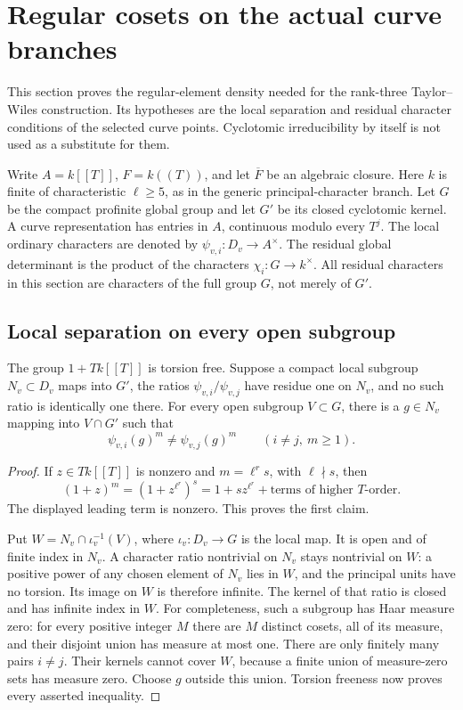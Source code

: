 \section{Regular cosets on the actual curve branches}
\label{sec:sr-curve-regular-cosets}
This section proves the regular-element density needed for the
rank-three Taylor--Wiles construction.  Its hypotheses are the
local separation and residual character conditions of the selected
curve points.  Cyclotomic irreducibility by itself is not used as a
substitute for them.

Write \(A=k[[T]]\), \(F=k((T))\), and let \(\overline F\) be an
algebraic closure.  Here \(k\) is finite of characteristic
\(\ell\ge5\), as in the generic principal-character branch.
Let \(G\) be the compact profinite global group and let
\(G'\) be its closed cyclotomic kernel.  A curve representation has
entries in \(A\), continuous modulo every \(T^j\).
The local ordinary characters are denoted by
\(\psi_{v,i}:D_v\to A^\times\).
The residual global determinant is the product of the characters
\(\chi_i:G\to k^\times\).  All residual characters in this section
are characters of the full group \(G\), not merely of \(G'\).

\subsection{Local separation on every open subgroup}
\begin{srlemma}
\label{lem:sr-curve-principal-units}
The group \(1+Tk[[T]]\) is torsion free.
Suppose a compact local subgroup \(N_v\subset D_v\) maps into \(G'\),
the ratios \(\psi_{v,i}/\psi_{v,j}\) have residue one on \(N_v\),
and no such ratio is identically one there.
For every open subgroup \(V\subset G\), there is a
\(g\in N_v\) mapping into \(V\cap G'\) such that
\[
       \psi_{v,i}(g)^m\ne\psi_{v,j}(g)^m
       \qquad(i\ne j,\ m\ge1).
\]
\end{srlemma}
\begin{proof}
If \(z\in Tk[[T]]\) is nonzero and
\(m=\ell^r s\), with \(\ell\nmid s\), then
\[
 (1+z)^m=(1+z^{\ell^r})^s
       =1+s z^{\ell^r}+\text{terms of higher \(T\)-order}.
\]
The displayed leading term is nonzero.  This proves the first claim.

Put \(W=N_v\cap \iota_v^{-1}(V)\), where
\(\iota_v:D_v\to G\) is the local map.
It is open and of finite index in \(N_v\).
A character ratio nontrivial on \(N_v\) stays nontrivial on \(W\):
a positive power of any chosen element of \(N_v\) lies in \(W\),
and the principal units have no torsion.
Its image on \(W\) is therefore infinite.
The kernel of that ratio is closed and has infinite index in \(W\).
For completeness, such a subgroup has Haar measure zero:
for every positive integer \(M\) there are \(M\) distinct cosets,
all of its measure, and their disjoint union has measure at most one.
There are only finitely many pairs \(i\ne j\).
Their kernels cannot cover \(W\), because a finite union of
measure-zero sets has measure zero.
Choose \(g\) outside this union.
Torsion freeness now proves every asserted inequality.
\end{proof}

